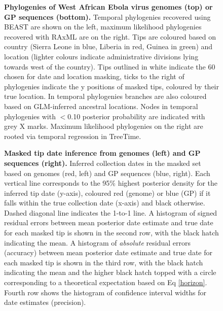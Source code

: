 \documentclass{bmcart}
\def\texttt{[image: ]}
\begin{document}
\begin{backmatter}
\begin{figure}[h]
 \centering
	\caption{\textbf{Phylogenies of West African Ebola virus genomes (top) or GP sequences (bottom).}
	Temporal phylogenies recovered using BEAST are shown on the left, maximum likelihood phylogenies recovered with RAxML are on the right.
  Tips are coloured based on country (Sierra Leone in blue, Liberia in red, Guinea in green) and location (lighter colours indicate administrative divisions lying towards west of the country).
  Tips outlined in white indicate the 60 chosen for date and location masking, ticks to the right of phylogenies indicate the y positions of masked tips, coloured by their true location.
  In temporal phylogenies branches are also coloured based on GLM-inferred ancestral locations.
  Nodes in temporal phylogenies with $<$0.10 posterior probability are indicated with grey X marks.
  Maximum likelihood phylogenies on the right are rooted via temporal regression in TreeTime.
	}
	\label{trees}
\end{figure}


\begin{figure}[h]
 \centering
	\caption{\textbf{Masked tip date inference from genomes (left) and GP sequences (right).}
  Inferred collection dates in the masked set based on genomes (red, left) and GP sequences (blue, right).
  Each vertical line corresponds to the 95\% highest posterior density for the inferred tip date (y-axis), coloured red (genome) or blue (GP) if it falls within the true collection date (x-axis) and black otherwise.
  Dashed diagonal line indicates the 1-to-1 line.
  A histogram of signed residual errors between mean posterior date estimate and true date for each masked tip is shown in the second row, with the black hatch indicating the mean.
  A histogram of \textit{absolute} residual errors (accuracy) between mean posterior date estimate and true date for each masked tip is shown in the third row, with the black hatch indicating the mean and the higher black hatch topped with a circle corresponding to a theoretical expectation based on Eq \ref{horizon}.
  Fourth row shows the histogram of confidence interval widths for date estimates (precision).
	}
	\label{dates}
\end{figure}


\end{backmatter}
\end{document}
